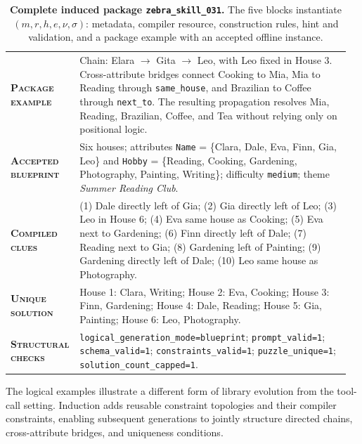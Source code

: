 \begin{table}[htbp]
\centering
\begin{minipage}{0.97\textwidth}
\raggedright
\small
\setlength{\tabcolsep}{3pt}
\renewcommand{\arraystretch}{1.16}
\vspace{0.35em}
\begin{tabular}{@{}>{\raggedright\arraybackslash\bfseries}p{0.17\linewidth} >{\raggedright\arraybackslash}p{0.79\linewidth}@{}}
    \textsc{Package example} & Chain: Elara $\rightarrow$ Gita $\rightarrow$ Leo, with Leo fixed in House 3. Cross-attribute bridges connect Cooking to Mia, Mia to Reading through \texttt{same\_house}, and Brazilian to Coffee through \texttt{next\_to}. The resulting propagation resolves Mia, Reading, Brazilian, Coffee, and Tea without relying only on positional logic. \\
    \textsc{Accepted blueprint} & Six houses; attributes \texttt{Name} = \{Clara, Dale, Eva, Finn, Gia, Leo\} and \texttt{Hobby} = \{Reading, Cooking, Gardening, Photography, Painting, Writing\}; difficulty \texttt{medium}; theme \emph{Summer Reading Club}. \\
    \textsc{Compiled clues} & (1) Dale directly left of Gia; (2) Gia directly left of Leo; (3) Leo in House 6; (4) Eva same house as Cooking; (5) Eva next to Gardening; (6) Finn directly left of Dale; (7) Reading next to Gia; (8) Gardening left of Painting; (9) Gardening directly left of Dale; (10) Leo same house as Photography. \\
    \textsc{Unique solution} & House 1: Clara, Writing; House 2: Eva, Cooking; House 3: Finn, Gardening; House 4: Dale, Reading; House 5: Gia, Painting; House 6: Leo, Photography. \\
    \textsc{Structural checks} & \texttt{logical\_generation\_mode=blueprint}; \texttt{prompt\_valid=1}; \texttt{schema\_valid=1}; \texttt{constraints\_valid=1}; \texttt{puzzle\_unique=1}; \texttt{solution\_count\_capped=1}. \\
\end{tabular}
\vspace{0.45em}
\end{minipage}
\caption{\textbf{Complete induced package \texttt{zebra\_skill\_031}.} The five blocks instantiate $(m,r,h,e,\nu,\sigma)$: metadata, compiler resource, construction rules, hint and validation, and a package example with an accepted offline instance.}
\label{tab:complete_logical_skill}
\end{table}

The logical examples illustrate a different form of library evolution from the tool-call setting. Induction adds reusable constraint topologies and their compiler constraints, enabling subsequent generations to jointly structure directed chains, cross-attribute bridges, and uniqueness conditions.
